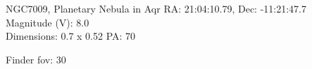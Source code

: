 \begin{block}{NGC7009, Planetary Nebula in Aqr}
    RA: 21:04:10.79, Dec: -11:21:47.7 \\ 
    Magnitude (V): 8.0 \\ 
    Dimensions: 0.7 x 0.52 PA: 70 

    Finder fov: 30 
\end{block}